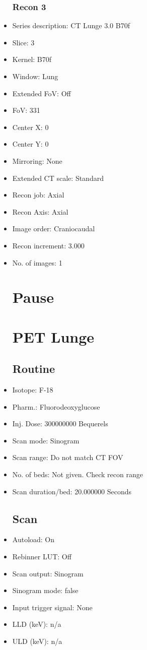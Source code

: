\documentclass[12pt]{article}
\begin{document}
\begin{itemize}[noitemsep]
\subsubsection{Recon 3}
\item Series description: CT Lunge 3.0 B70f
\item Slice: 3
\item Kernel: B70f
\item Window: Lung
\item Extended FoV: Off
\item FoV: 331
\item Center X: 0
\item Center Y: 0
\item Mirroring: None
\item Extended CT scale: Standard
\item Recon job: Axial
\item Recon Axis: Axial
\item Image order: Craniocaudal
\item Recon increment: 3.000
\item No. of images: 1
\section{Pause}
\section{PET Lunge }\subsection{Routine}
\item Isotope: F-18
\item Pharm.: Fluorodeoxyglucose
\item Inj. Dose: 300000000 Bequerels
\item Scan mode: Sinogram
\item Scan range: Do not match CT FOV
\item No. of beds: Not given. Check recon range
\item Scan duration/bed: 20.000000 Seconds
\subsection{Scan}
\item Autoload: On
\item Rebinner LUT: Off
\item Scan output: Sinogram
\item Sinogram mode: false
\item Input trigger signal: None
\item LLD (keV): n/a
\item ULD (keV): n/a

\end{itemize}
\end{document}

